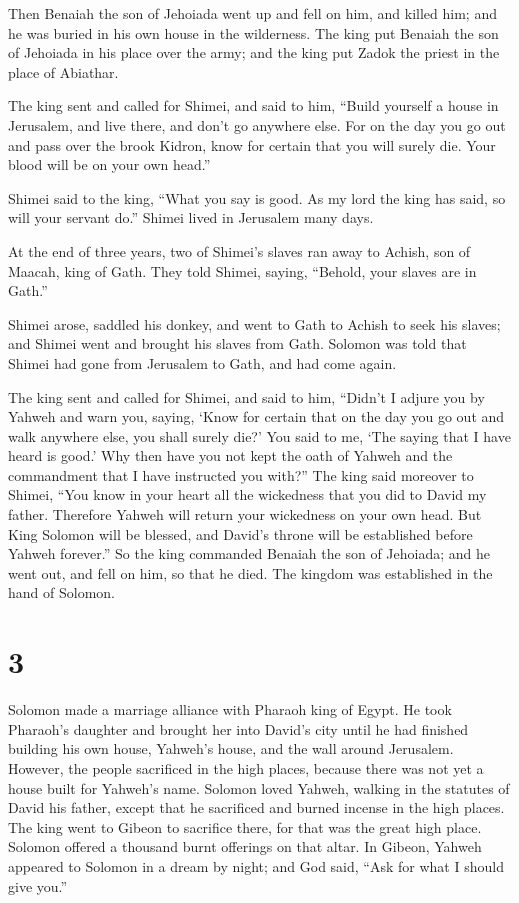  Then Benaiah the son of Jehoiada went up and fell on
him, and killed him; and he was buried in his own house in the
wilderness.  The king put Benaiah the son of Jehoiada in
his place over the army; and the king put Zadok the priest in the place
of Abiathar.

 The king sent and called for Shimei, and said to him,
``Build yourself a house in Jerusalem, and live there, and don't go
anywhere else.  For on the day you go out and pass over
the brook Kidron, know for certain that you will surely die. Your blood
will be on your own head.''

 Shimei said to the king, ``What you say is good. As my
lord the king has said, so will your servant do.'' Shimei lived in
Jerusalem many days.

 At the end of three years, two of Shimei's slaves ran
away to Achish, son of Maacah, king of Gath. They told Shimei, saying,
``Behold, your slaves are in Gath.''

 Shimei arose, saddled his donkey, and went to Gath to
Achish to seek his slaves; and Shimei went and brought his slaves from
Gath.  Solomon was told that Shimei had gone from
Jerusalem to Gath, and had come again.

 The king sent and called for Shimei, and said to him,
``Didn't I adjure you by Yahweh and warn you, saying, `Know for certain
that on the day you go out and walk anywhere else, you shall surely
die?' You said to me, `The saying that I have heard is good.'
 Why then have you not kept the oath of Yahweh and the
commandment that I have instructed you with?''  The king
said moreover to Shimei, ``You know in your heart all the wickedness
that you did to David my father. Therefore Yahweh will return your
wickedness on your own head.  But King Solomon will be
blessed, and David's throne will be established before Yahweh forever.''
 So the king commanded Benaiah the son of Jehoiada; and
he went out, and fell on him, so that he died. The kingdom was
established in the hand of Solomon.

\hypertarget{section-2}{%
\section{3}\label{section-2}}

 Solomon made a marriage alliance with Pharaoh king of
Egypt. He took Pharaoh's daughter and brought her into David's city
until he had finished building his own house, Yahweh's house, and the
wall around Jerusalem.  However, the people sacrificed in
the high places, because there was not yet a house built for Yahweh's
name.  Solomon loved Yahweh, walking in the statutes of
David his father, except that he sacrificed and burned incense in the
high places.  The king went to Gibeon to sacrifice there,
for that was the great high place. Solomon offered a thousand burnt
offerings on that altar.  In Gibeon, Yahweh appeared to
Solomon in a dream by night; and God said, ``Ask for what I should give
you.''

